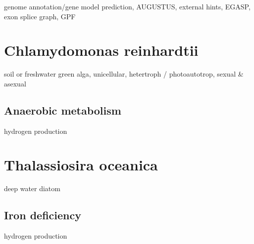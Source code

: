 \begin{todo}
genome annotation/gene model prediction, AUGUSTUS, external hints, 
EGASP, exon splice graph, GPF
\end{todo}

\section{Chlamydomonas reinhardtii}

\begin{todo}
soil or freshwater green alga, unicellular, hetertroph / photoautotrop, sexual & asexual
\end{todo}

\subsection{Anaerobic metabolism}

\begin{todo}
hydrogen production
\end{todo}

\section{Thalassiosira oceanica}

\begin{todo}
deep water diatom
\end{todo}

\subsection{Iron deficiency}

\begin{todo}
hydrogen production
\end{todo}
